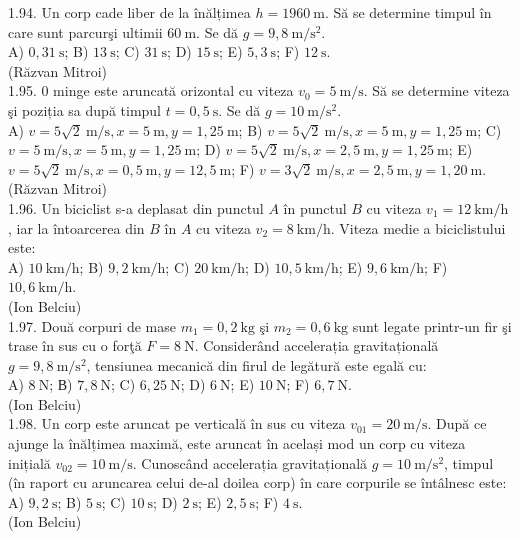 \documentclass[10pt]{article}
\begin{document}
1.94. Un corp cade liber de la înălțimea $h=1960 \mathrm{~m}$. Să se determine timpul în care sunt parcurşi ultimii $60 \mathrm{~m}$. Se dă $g=9,8 \mathrm{~m} / \mathrm{s}^{2}$.\\ A) $0,31 \mathrm{~s}$; B) $13 \mathrm{~s}$; C) $31 \mathrm{~s}$; D) $15 \mathrm{~s}$; E) $5,3 \mathrm{~s}$; F) $12 \mathrm{~s}$.\\ (Răzvan Mitroi)\\

1.95. 0 minge este aruncată orizontal cu viteza $v_{0}=5 \mathrm{~m} / \mathrm{s}$. Să se determine viteza şi poziția sa după timpul $t=0,5 \mathrm{~s}$. Se dă $g=10 \mathrm{~m} / \mathrm{s}^{2}$.\\ A) $v=5 \sqrt{2} \mathrm{~m} / \mathrm{s}, x=5 \mathrm{~m}, y=1,25 \mathrm{~m}$; B) $v=5 \sqrt{2} \mathrm{~m} / \mathrm{s}, x=5 \mathrm{~m}, y=1,25 \mathrm{~m}$; C) $v=5 \mathrm{~m} / \mathrm{s}, x=5 \mathrm{~m}, y=1,25 \mathrm{~m}$; D) $v=5 \sqrt{2} \mathrm{~m} / \mathrm{s}, x=2,5 \mathrm{~m}, y=1,25 \mathrm{~m}$; E) $v=5 \sqrt{2} \mathrm{~m} / \mathrm{s}, x=0,5 \mathrm{~m}, y=12,5 \mathrm{~m}$; F) $v=3 \sqrt{2} \mathrm{~m} / \mathrm{s}, x=2,5 \mathrm{~m}, y=1,20 \mathrm{~m}$.\\ (Răzvan Mitroi)\\

1.96. Un biciclist s-a deplasat din punctul $A$ în punctul $B$ cu viteza $v_{1}=12 \mathrm{~km} / \mathrm{h}$, iar la întoarcerea din $B$ în $A$ cu viteza $v_{2}=8 \mathrm{~km} / \mathrm{h}$. Viteza medie a biciclistului este:\\ A) $10 \mathrm{~km} / \mathrm{h}$; B) $9,2 \mathrm{~km} / \mathrm{h}$; C) $20 \mathrm{~km} / \mathrm{h}$; D) $10,5 \mathrm{~km} / \mathrm{h}$; E) $9,6 \mathrm{~km} / \mathrm{h}$; F) $10,6 \mathrm{~km} / \mathrm{h}$.\\ (Ion Belciu)\\

1.97. Două corpuri de mase $m_{1}=0,2 \mathrm{~kg}$ şi $m_{2}=0,6 \mathrm{~kg}$ sunt legate printr-un fir şi trase în sus cu o forţă $F=8 \mathrm{~N}$. Considerând accelerația gravitațională $g=9,8 \mathrm{~m} / \mathrm{s}^{2}$, tensiunea mecanică din firul de legătură este egală cu:\\ A) $8 \mathrm{~N}$; В) $7,8 \mathrm{~N}$; C) $6,25 \mathrm{~N}$; D) $6 \mathrm{~N}$; E) $10 \mathrm{~N}$; F) $6,7 \mathrm{~N}$.\\ (Ion Belciu)\\

1.98. Un corp este aruncat pe verticală în sus cu viteza $v_{01}=20 \mathrm{~m} / \mathrm{s}$. După ce ajunge la înălțimea maximă, este aruncat în același mod un corp cu viteza inițială $v_{02}=10 \mathrm{~m} / \mathrm{s}$. Cunoscând accelerația gravitațională $g=10 \mathrm{~m} / \mathrm{s}^{2}$, timpul (în raport cu aruncarea celui de-al doilea corp) în care corpurile se întâlnesc este:\\ A) $9,2 \mathrm{~s}$; B) $5 \mathrm{~s}$; C) $10 \mathrm{~s}$; D) $2 \mathrm{~s}$; E) $2,5 \mathrm{~s}$; F) $4 \mathrm{~s}$.\\ (Ion Belciu)\\
\end{document}
